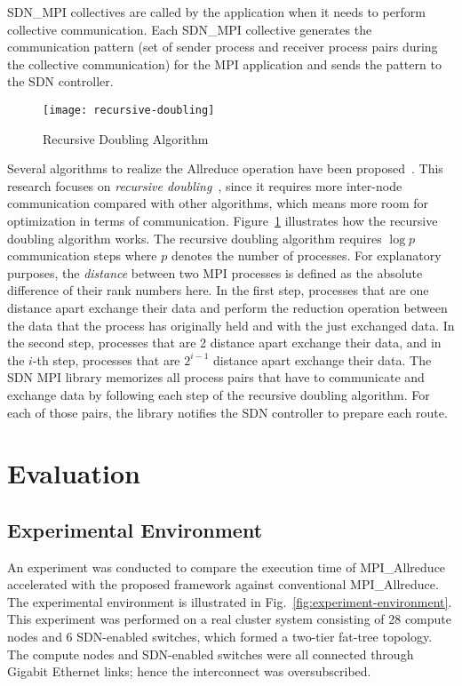 SDN\_MPI collectives are called by the application when it needs to perform
collective communication. Each SDN\_MPI collective generates the communication
pattern (set of sender process and receiver process pairs during the
collective communication) for the MPI application and sends the pattern to the
SDN controller.

\begin{figure}
    \centering
    \texttt{[image: recursive-doubling]}
    \caption{Recursive Doubling Algorithm}%
    \label{fig:recursive-doubling}
\end{figure}

Several algorithms to realize the Allreduce operation have been
proposed~\autocite{Rabenseifner2004,Thakur2005,Kandalla2012,Ruefenacht2017}.
This research focuses on \emph{recursive doubling}~\autocite{Thakur2005},
since it requires more inter-node communication compared with other
algorithms, which means more room for optimization in terms of communication.
Figure~\ref{fig:recursive-doubling} illustrates how the recursive doubling
algorithm works. The recursive doubling algorithm requires $\log p$
communication steps where $p$ denotes the number of processes. For explanatory
purposes, the \emph{distance} between two MPI processes is defined as the
absolute difference of their rank numbers here. In the first step, processes
that are one distance apart exchange their data and perform the reduction
operation between the data that the process has originally held and with the
just exchanged data. In the second step, processes that are 2 distance apart
exchange their data, and in the $i$-th step, processes that are $2^{i - 1}$
distance apart exchange their data. The SDN MPI library memorizes all process
pairs that have to communicate and exchange data by following each step of the
recursive doubling algorithm. For each of those pairs, the library notifies
the SDN controller to prepare each route.

\section{Evaluation}\label{sec:iii-evaluation}

\subsection{Experimental Environment}

An experiment was conducted to compare the execution time of MPI\_Allreduce
accelerated with the proposed framework against conventional
MPI\_Allreduce. The experimental environment is illustrated in
Fig.~\ref{fig:experiment-environment}. This experiment was performed on
a real cluster system consisting of 28 compute nodes and 6 SDN-enabled
switches, which formed a two-tier fat-tree topology. The compute nodes and
SDN-enabled switches were all connected through Gigabit Ethernet links;
hence the interconnect was oversubscribed.

